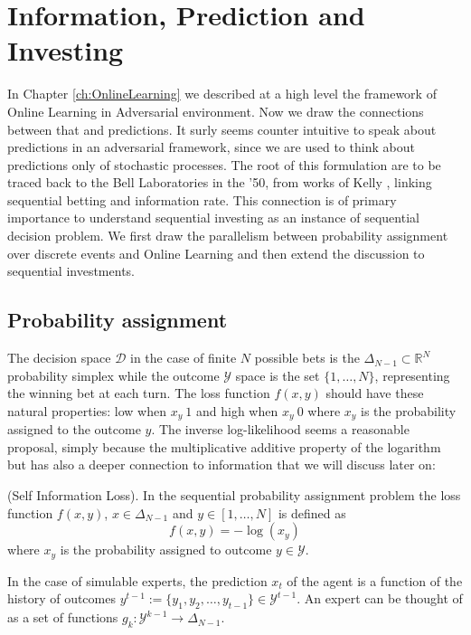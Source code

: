 \chapter{Information, Prediction and Investing}

In Chapter \ref{ch:OnlineLearning} we described at a high level the framework of Online Learning in Adversarial environment. Now we draw the connections between that and predictions. It surly seems counter intuitive to speak about predictions in an adversarial framework, since we are used to think about predictions only of stochastic processes. The root of this formulation are to be traced back to the Bell Laboratories in the '50, from works of Kelly \cite{kelly2011new}, linking sequential betting and information rate. This connection is of primary importance to understand sequential investing as an instance of sequential decision problem.
We first draw the parallelism between probability assignment over discrete events and Online Learning and then extend the discussion to sequential investments.

\section{Probability assignment}
The decision space $\mathcal D$ in the case of finite $N$ possible bets is the $\Delta_{N-1}\subset \mathbb R^{N}$ probability simplex while the outcome $\mathcal Y$ space is the set $\{1,\ldots,N\}$, representing the winning bet at each turn. The loss function $f(x,y)$ should have these natural properties: low when $x_y~1$ and high when $x_y~0$ where $x_y$ is the probability assigned to the outcome $y$. The inverse log-likelihood seems a reasonable proposal, simply because the multiplicative additive property of the logarithm but has also a deeper connection to information that we will discuss later on:

\begin{definition}(Self Information Loss).
    In the sequential probability assignment problem the loss function $f(x,y)$, $x\in \Delta_{N-1}$ and $y\in[1,\ldots,N]$ is defined as
    $$f(x,y)=-\log(x_y)$$
where $x_y$ is the probability assigned to outcome $y\in\mathcal Y$.
\end{definition}

In the case of simulable experts, the prediction $x_t$ of the agent is a function of the history of outcomes $y^{t-1}:=\{y_1,y_2,\ldots,y_{t-1}\}\in\mathcal Y^{t-1}$. An expert can be thought of as a set of functions $g_k:\mathcal Y^{k-1}\to\Delta_{N-1}$.



